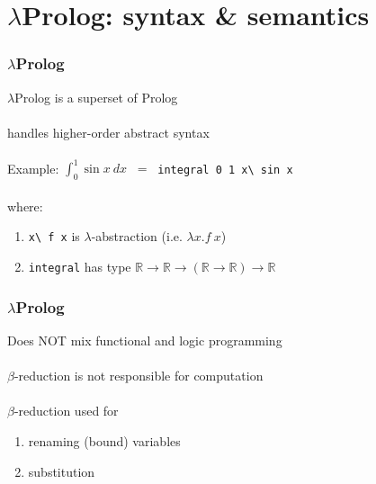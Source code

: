 \documentclass{beamer}
\newcommand{\bs}{\textbackslash\,}
\begin{document}
\section{$\lambda$Prolog: syntax \& semantics}

\begin{frame}
 \frametitle{$\lambda$Prolog}
 $\lambda$Prolog is a superset of Prolog\\~\\

 handles \alert{higher-order abstract syntax}\\~\\

 Example: $\int_0^1 \sin x~dx$ $~=~$ \texttt{integral 0 1 x\bs sin x}\\~\\

 where:
 \begin{enumerate}
   \item \texttt{x\bs f x} is $\lambda$-abstraction (i.e. $\lambda x. f~x$)
   \item \texttt{integral} has type $\mathbb{R} \to \mathbb{R} \to (\mathbb{R} \to \mathbb{R}) \to \mathbb{R}$
 \end{enumerate}
\end{frame}

\begin{frame}
 \frametitle{$\lambda$Prolog}

 Does NOT mix functional and logic programming\\~\\

 $\beta$-reduction is not responsible for computation\\~\\

 $\beta$-reduction used for\\
 \begin{enumerate}
  \item renaming (bound) variables
  \item substitution
 \end{enumerate}
\end{frame}

%
\end{document}
